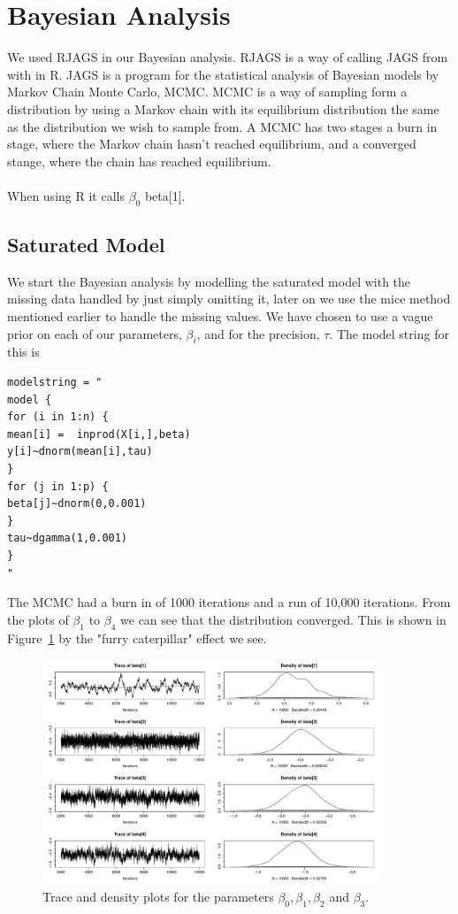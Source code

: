 \documentclass{article}
\begin{document}
\section{Bayesian Analysis}
We used RJAGS in our Bayesian analysis. RJAGS is a way of calling JAGS from with in \textsf{R}. JAGS is a program for the statistical analysis of Bayesian models by Markov Chain Monte Carlo, MCMC. MCMC is a way of sampling form a distribution by using a Markov chain with its equilibrium distribution the same as the distribution we wish to sample from. A MCMC has two stages a burn in stage, where the Markov chain hasn't reached equilibrium, and a converged stange, where the chain has reached equilibrium.
\\\\
When using \textsf{R} it calls $\beta_0$ beta[1].
\subsection{Saturated Model}
We start the Bayesian analysis by modelling the saturated model with the missing data handled by just simply omitting it, later on we use the mice method mentioned earlier to handle the missing values. We have chosen to use a vague prior on each of our parameters, $\beta_i$, and for the precision, $\tau$. The model string  for this is 
{\small
\begin{verbatim}
modelstring = "
model {
for (i in 1:n) {
mean[i] =  inprod(X[i,],beta)
y[i]~dnorm(mean[i],tau)
}
for (j in 1:p) {
beta[j]~dnorm(0,0.001)
}
tau~dgamma(1,0.001)
}
"
\end{verbatim}
}
\noindent The MCMC had a burn in of 1000 iterations and a run of 10,000 iterations. From the plots of $\beta_1$ to $\beta_4$ we can see that the distribution converged. This is shown in Figure~\ref{saturated_beta1-4} by the "furry caterpillar" effect we see.
\begin{figure}[h!]
\centering
\includegraphics[width = 0.9\textwidth]{saturatedOutput/beta1-4.pdf}
\caption{Trace and density plots for the parameters $\beta_0, \beta_1, \beta_2$ and $\beta_3$.}
\label{saturated_beta1-4}
\end{figure}
\end{document}
